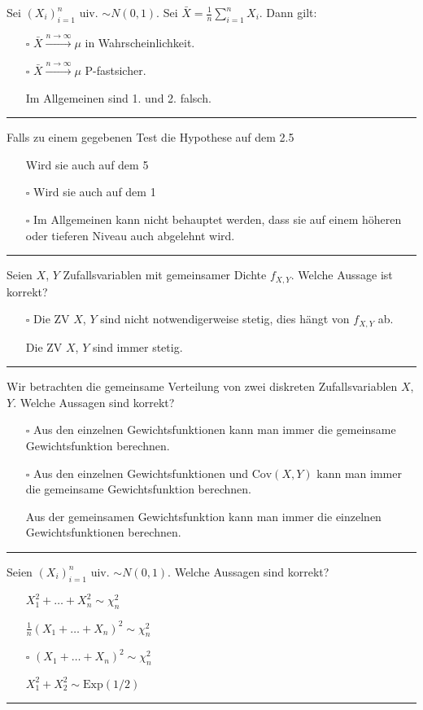 Sei $(X_i)_{i=1}^n$ uiv. $\sim N(0, 1)$. Sei $\bar{X} = \frac{1}{n} \sum_{i=1}^{n} X_i$. Dann gilt:
\begin{itemize}
    \item[$\square$] $\bar{X} \overset{n \to \infty}{\longrightarrow} \mu$ in Wahrscheinlichkeit.
    \item[$\square$] $\bar{X} \overset{n \to \infty}{\longrightarrow} \mu$ P-fastsicher.
    \item[\checkmark] Im Allgemeinen sind 1. und 2. falsch.
\end{itemize}
\rule{\linewidth}{0.4pt}

Falls zu einem gegebenen Test die Hypothese auf dem 2.5%
\begin{itemize}
    \item[\checkmark] Wird sie auch auf dem 5%
    \item[$\square$] Wird sie auch auf dem 1%
    \item[$\square$] Im Allgemeinen kann nicht behauptet werden, dass sie auf einem höheren oder tieferen Niveau auch abgelehnt wird.
\end{itemize}
\rule{\linewidth}{0.4pt}

Seien $X$, $Y$ Zufallsvariablen mit gemeinsamer Dichte $f_{X,Y}$. Welche Aussage ist korrekt?
\begin{itemize}
    \item[$\square$] Die ZV $X$, $Y$ sind nicht notwendigerweise stetig, dies hängt von $f_{X,Y}$ ab.
    \item[\checkmark] Die ZV $X$, $Y$ sind immer stetig.
\end{itemize}
\rule{\linewidth}{0.4pt}

Wir betrachten die gemeinsame Verteilung von zwei diskreten Zufallsvariablen $X$, $Y$. Welche Aussagen sind korrekt?
\begin{itemize}
    \item[$\square$] Aus den einzelnen Gewichtsfunktionen kann man immer die gemeinsame Gewichtsfunktion berechnen.
    \item[$\square$] Aus den einzelnen Gewichtsfunktionen und $\text{Cov}(X, Y)$ kann man immer die gemeinsame Gewichtsfunktion berechnen.
    \item[\checkmark] Aus der gemeinsamen Gewichtsfunktion kann man immer die einzelnen Gewichtsfunktionen berechnen.
\end{itemize}
\rule{\linewidth}{0.4pt}

Seien $(X_i)_{i=1}^n$ uiv. $\sim N(0, 1)$. Welche Aussagen sind korrekt?
\begin{itemize}
    \item[\checkmark] $X_1^2 + \dots + X_n^2 \sim \chi^2_n$
    \item[\checkmark] $\frac{1}{n}(X_1 + \dots + X_n)^2 \sim \chi^2_n$
    \item[$\square$] $(X_1 + \dots + X_n)^2 \sim \chi^2_n$
    \item[\checkmark] $X_1^2 + X_2^2 \sim \text{Exp}(1/2)$
\end{itemize}
\rule{\linewidth}{0.4pt}

